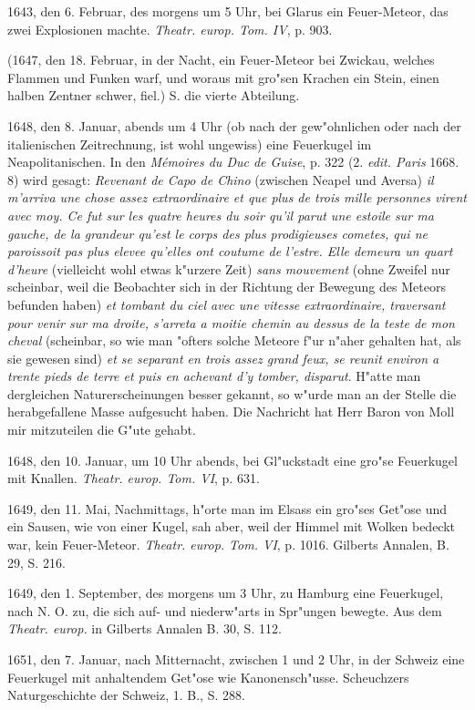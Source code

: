 \documentclass[a4paper, 11pt, oneside, polutonikogreek, german]{article}
\begin{document}
1643, den 6. Februar, des morgens um 5 Uhr, bei Glarus ein Feuer-Meteor, das zwei Explosionen machte. \emph{Theatr. europ. Tom. IV}, p. 903.

(1647, den 18. Februar, in der Nacht, ein Feuer-Meteor bei Zwickau, welches Flammen und Funken warf, und woraus mit gro"sen Krachen ein Stein, einen halben Zentner schwer, fiel.) S. die vierte Abteilung.

1648, den 8. Januar, abends um 4 Uhr (ob nach der gew"ohnlichen oder nach der italienischen Zeitrechnung, ist wohl ungewiss) eine Feuerkugel im Neapolitanischen. In den \emph{Mémoires du Duc de Guise}, p. 322 (2. \emph{edit. Paris} 1668. 8) wird gesagt: \emph{Revenant de Capo de Chino} (zwischen Neapel und Aversa) \emph{il m'arriva une chose assez extraordinaire et que plus de trois mille personnes virent avec moy. Ce fut sur les quatre heures du soir qu'il parut une estoile sur ma gauche, de la grandeur qu'est le corps des plus prodigieuses cometes, qui ne paroissoit pas plus elevee qu'elles ont coutume de l'estre. Elle demeura un quart d'heure} (vielleicht wohl etwas k"urzere Zeit) \emph{sans mouvement} (ohne Zweifel nur scheinbar, weil die Beobachter sich in der Richtung der Bewegung des Meteors befunden haben) \emph{et tombant du ciel avec une vitesse extraordinaire, traversant pour venir sur ma droite, s'arreta a moitie chemin au dessus de la teste de mon cheval} (scheinbar, so wie man "ofters solche Meteore f"ur n"aher gehalten hat, als sie gewesen sind) \emph{et se separant en trois assez grand feux, se reunit environ a trente pieds de terre et puis en achevant d'y tomber, disparut}. H"atte man dergleichen Naturerscheinungen besser gekannt, so w"urde man an der Stelle die herabgefallene Masse aufgesucht haben. Die Nachricht hat Herr Baron von Moll mir mitzuteilen die G"ute gehabt.

1648, den 10. Januar, um 10 Uhr abends, bei Gl"uckstadt eine gro"se Feuerkugel mit Knallen. \emph{Theatr. europ. Tom. VI}, p. 631.

1649, den 11. Mai, Nachmittags, h"orte man im Elsass ein gro"ses Get"ose und ein Sausen, wie von einer Kugel, sah aber, weil der Himmel mit Wolken bedeckt war, kein Feuer-Meteor. \emph{Theatr. europ. Tom. VI}, p. 1016. Gilberts Annalen, B. 29, S. 216.

1649, den 1. September, des morgens um 3 Uhr, zu Hamburg eine Feuerkugel, nach N. O. zu, die sich auf- und niederw"arts in Spr"ungen bewegte. Aus dem \emph{Theatr. europ.} in Gilberts Annalen B. 30, S. 112.

1651, den 7. Januar, nach Mitternacht, zwischen 1 und 2 Uhr, in der Schweiz eine Feuerkugel mit anhaltendem Get"ose wie Kanonensch"usse. Scheuchzers Naturgeschichte der Schweiz, 1. B., S. 288.
\end{document}
